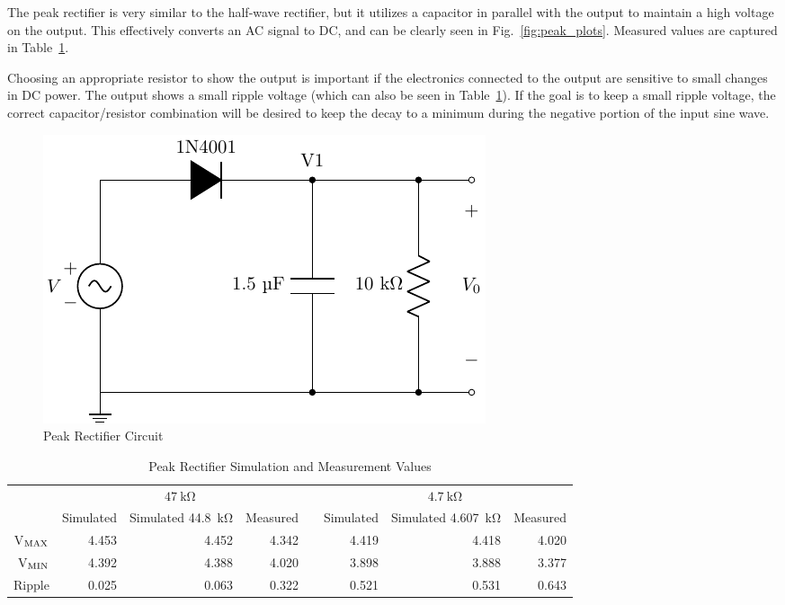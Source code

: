 \documentclass{../../ece-report}
\begin{document}
The peak rectifier is very similar to the half-wave
rectifier, but it utilizes a capacitor in parallel with
the output to maintain a high voltage on the output.
This effectively converts an AC signal to DC, and can
be clearly seen in Fig.~\ref{fig:peak_plots}. Measured
values are captured in Table~\ref{tab:peak}.

Choosing an appropriate resistor to show the output
is important if the electronics connected to the output
are sensitive to small changes in DC power. The output
shows a small ripple voltage (which can also be seen
in Table~\ref{tab:peak}). If the goal is to keep a small
ripple voltage, the correct capacitor/resistor combination
will be desired to keep the decay to a minimum during
the negative portion of the input sine wave.

\begin{figure}[h!]
  \centering
  \includegraphics{../circuits/peak_circuit.pdf}
  \caption{Peak Rectifier Circuit}
  \label{fig:peak_circuit}
\end{figure}

\begin{table}[h!]
  \centering
  \begin{tabular}{rrrrcrrr}\toprule
    & \multicolumn{3}{c}{$47~\si{\kohm}$} & & \multicolumn{3}{c}{$4.7~\si{\kohm}$} \\
    \cmidrule(lr){2-4} \cmidrule(lr){6-8}
    & Simulated & Simulated 44.8~\si{\kohm} & Measured & & Simulated & Simulated 4.607~\si{\kohm} & Measured \\
    V$_\textnormal{MAX}$ & 4.453 & 4.452  & 4.342  & & 4.419  & 4.418  & 4.020 \\
    V$_\textnormal{MIN}$ & 4.392 & 4.388  & 4.020  & & 3.898  & 3.888  & 3.377 \\
    Ripple               & 0.025 & 0.063  & 0.322  & & 0.521  & 0.531  & 0.643 \\
    \bottomrule
  \end{tabular}
  \caption{Peak Rectifier Simulation and Measurement Values}
  \label{tab:peak}
\end{table}
\end{document}
